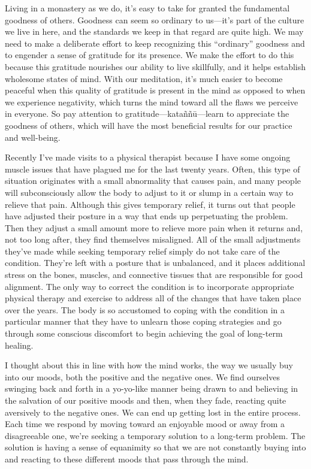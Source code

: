 Living in a monastery as we do, it's easy to take for granted the 
fundamental goodness of others. Goodness can seem so ordinary to 
us---it's part of the culture we live in here, and the standards we 
keep in that regard are quite high. We may need to make a deliberate 
effort to keep recognizing this ``ordinary'' goodness and to engender a 
sense of gratitude for its presence. We make the effort to do this 
because this gratitude nourishes our ability to live skillfully, and it 
helps establish wholesome states of mind. With our meditation, it's 
much easier to become peaceful when this quality of gratitude is 
present in the mind as opposed to when we experience negativity, which 
turns the mind toward all the flaws we perceive in everyone. So pay 
attention to gratitude---kataññū---learn to appreciate the goodness 
of others, which will have the most beneficial results for our practice 
and well-being.


Recently I've made visits to a physical therapist because I have some 
ongoing muscle issues that have plagued me for the last twenty years. 
Often, this type of situation originates with a small abnormality that 
causes pain, and many people will subconsciously allow the body to 
adjust to it or slump in a certain way to relieve that pain. Although 
this gives temporary relief, it turns out that people have adjusted 
their posture in a way that ends up perpetuating the problem. Then they 
adjust a small amount more to relieve more pain when it returns and, 
not too long after, they find themselves misaligned. All of the small 
adjustments they've made while seeking temporary relief simply do not 
take care of the condition. They're left with a posture that is 
unbalanced, and it places additional stress on the bones, muscles, and 
connective tissues that are responsible for good alignment. The only 
way to correct the condition is to incorporate appropriate physical 
therapy and exercise to address all of the changes that have taken 
place over the years. The body is so accustomed to coping with the 
condition in a particular manner that they have to unlearn those coping 
strategies and go through some conscious discomfort to begin achieving 
the goal of long-term healing.

I thought about this in line with how the mind works, the way we 
usually buy into our moods, both the positive and the negative ones. We 
find ourselves swinging back and forth in a yo-yo-like manner being 
drawn to and believing in the salvation of our positive moods and then, 
when they fade, reacting quite aversively to the negative ones. We can 
end up getting lost in the entire process. Each time we respond by 
moving toward an enjoyable mood or away from a disagreeable one, we're 
seeking a temporary solution to a long-term problem. The solution is 
having a sense of equanimity so that we are not constantly buying into 
and reacting to these different moods that pass through the mind.

